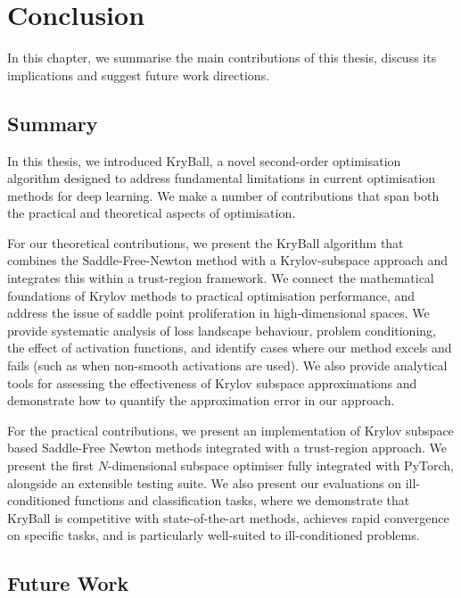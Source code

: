 \chapter{Conclusion}
\label{chap:conclusion}

In this chapter, we summarise the main contributions of this thesis, discuss its implications and suggest future work directions.

\section{Summary}

In this thesis, we introduced KryBall, a novel second-order optimisation algorithm designed to address fundamental limitations in current optimisation methods for deep learning. We make a number of contributions that span both the practical and theoretical aspects of optimisation. 

For our theoretical contributions, we present the KryBall algorithm that combines the Saddle-Free-Newton method with a Krylov-subspace approach and integrates this within a trust-region framework. We connect the mathematical foundations of Krylov methods to practical optimisation performance, and address the issue of saddle point proliferation in high-dimensional spaces. We provide systematic analysis of loss landscape behaviour, problem conditioning, the effect of activation functions, and identify cases where our method excels and fails (such as when non-smooth activations are used). We also provide analytical tools for assessing the effectiveness of Krylov subspace approximations and demonstrate how to quantify the approximation error in our approach.

For the practical contributions, we present an implementation of Krylov subspace based Saddle-Free Newton methods integrated with a trust-region approach. We present the first $N$-dimensional subspace optimiser fully integrated with PyTorch, alongside an extensible testing suite. We also present our evaluations on ill-conditioned functions and classification tasks, where we demonstrate that KryBall is competitive with state-of-the-art methods, achieves rapid convergence on specific tasks, and is particularly well-suited to ill-conditioned problems.

\section{Future Work}
\label{sec:future_work}

